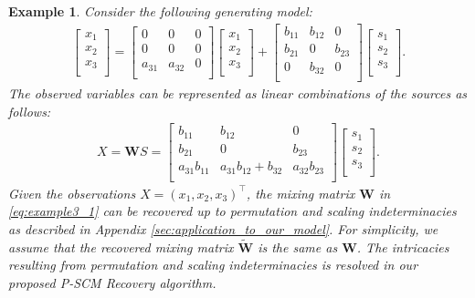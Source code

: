 \documentclass[12pt]{article}
\newtheorem{example}{Example}
\newcommand{\bW}{\mathbf{W}}
\begin{document}
\begin{example} \label{example:unique_components}
Consider the following generating model:
\begin{align} \label{eq:example3_0}
\begin{bmatrix}
x_1 \\
x_2 \\
x_3 \\
\end{bmatrix}
 = 
\begin{bmatrix}
0 & 0 & 0 \\
0 & 0 & 0 \\
a_{31} & a_{32} & 0 \\
\end{bmatrix}
\begin{bmatrix}
x_1 \\
x_2 \\
x_3 \\
\end{bmatrix}
+
\begin{bmatrix}
b_{11} & b_{12} & 0 \\
b_{21} & 0 & b_{23} \\
0 & b_{32} & 0 \\
\end{bmatrix}
\begin{bmatrix}
s_1 \\
s_2 \\
s_3 \\
\end{bmatrix}
.
\end{align}
The observed variables can be represented as linear combinations of the sources as follows: 
\begin{align}
X = \bW S=
\begin{bmatrix}
b_{11} & b_{12} & 0 \\
b_{21} & 0 & b_{23} \\
a_{31}b_{11} & a_{31}b_{12}+ b_{32} & a_{32}b_{23} \\
\end{bmatrix}
\begin{bmatrix}
s_1 \\
s_2 \\
s_3 \\
\end{bmatrix}.
\label{eq:example3_1}
\end{align}
Given the observations $X=(x_1,x_2,x_3)^{\top}$, the mixing matrix $\bW$ in \eqref{eq:example3_1} can be recovered up to permutation and scaling indeterminacies as described in Appendix \ref{sec:application_to_our_model}. %
For simplicity, we assume that the recovered mixing matrix $\tilde{\bW}$ is the same as $\bW$. The intricacies resulting from permutation and scaling indeterminacies is resolved in our proposed P-SCM Recovery algorithm. 
 

\end{example}
\end{document}
